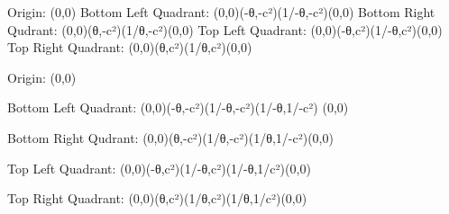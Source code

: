 Origin: (0,0) 
Bottom Left Quadrant: (0,0)(-θ,-c²)(1/-θ,-c²)(0,0) 
Bottom Right Qudrant: (0,0)(θ,-c²)(1/θ,-c²)(0,0) 
Top Left Quadrant: (0,0)(-θ,c²)(1/-θ,c²)(0,0) 
Top Right Quadrant: (0,0)(θ,c²)(1/θ,c²)(0,0)

Origin: (0,0) 

Bottom Left Quadrant: (0,0)(-θ,-c²)(1/-θ,-c²)(1/-θ,1/-c²) (0,0) 

Bottom Right Qudrant: (0,0)(θ,-c²)(1/θ,-c²)(1/θ,1/-c²)(0,0) 

Top Left Quadrant: (0,0)(-θ,c²)(1/-θ,c²)(1/-θ,1/c²)(0,0)
 
Top Right Quadrant: (0,0)(θ,c²)(1/θ,c²)(1/θ,1/c²)(0,0)
